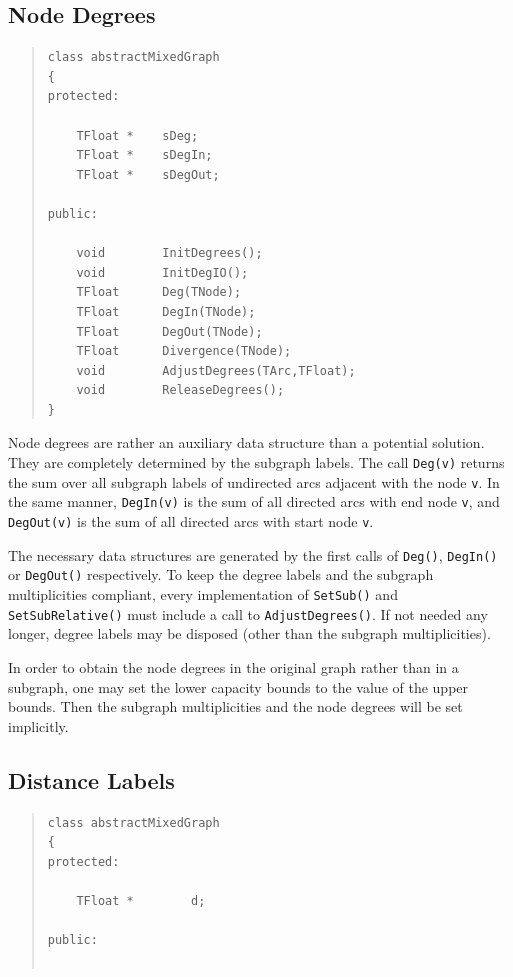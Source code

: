 \documentclass[a4paper,11pt,twoside]{book}
\begin{document}
\begin{multicols}{2}
\subsection{Node Degrees}
\label{slb_deg}
\begin{quote}
\begin{verbatim}
class abstractMixedGraph
{
protected:

    TFloat *    sDeg;
    TFloat *    sDegIn;
    TFloat *    sDegOut;

public:

    void        InitDegrees();
    void        InitDegIO();
    TFloat      Deg(TNode);
    TFloat      DegIn(TNode);
    TFloat      DegOut(TNode);
    TFloat      Divergence(TNode);
    void        AdjustDegrees(TArc,TFloat);
    void        ReleaseDegrees();
}
\end{verbatim}
\end{quote}
Node degrees are rather an auxiliary data structure than a potential solution.
They are completely determined by the subgraph labels. The call \verb/Deg(v)/
returns the sum over all subgraph labels of undirected arcs adjacent with
the node \verb/v/. In the same manner, \verb/DegIn(v)/ is the sum of all
directed arcs with end node \verb/v/, and \verb/DegOut(v)/ is the sum of all
directed arcs with start node \verb/v/.

The necessary data structures are generated by the first calls of \verb/Deg()/,
\verb/DegIn()/ or \verb/DegOut()/ respectively. To keep the degree labels and the
subgraph multiplicities compliant, every implementation of \verb/SetSub()/ and
\verb/SetSubRelative()/ must include a call to \verb/AdjustDegrees()/. If not
needed any longer, degree labels may be disposed (other than the subgraph
multiplicities).

In order to obtain the node degrees in the original graph rather than in a
subgraph, one may set the lower capacity bounds to the value of the upper bounds.
Then the subgraph multiplicities and the node degrees will be set implicitly.


\subsection{Distance Labels}
\methods
\begin{quote}
\begin{verbatim}
class abstractMixedGraph
{
protected:

    TFloat *        d;

public:


\end{verbatim}
\end{quote}
\end{multicols}
\end{document}

